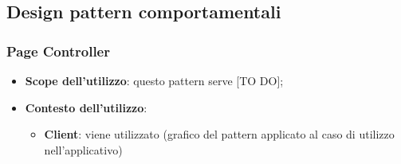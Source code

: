 %


\subsection{Design pattern comportamentali} %
\label{sub:design_pattern_comportamentali}
	\subsubsection{Page Controller} %
	\label{ssub:page_controller}
		\begin{itemize}
			\item \textbf{Scope dell'utilizzo}: questo pattern serve [TO DO];
			\item \textbf{Contesto dell'utilizzo}:
				\begin{itemize}
					\item \textbf{Client}: viene utilizzato \newline
					[TO DO] (grafico del pattern applicato al caso di utilizzo nell'applicativo)
				\end{itemize}
		\end{itemize}


